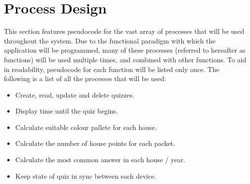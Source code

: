 \section{Process Design}
This section features pseudocode for the vast array of processes that will be used throughout the system. Due to the functional paradigm with which the application will be programmed, many of these processes (referred to hereafter as functions) will be used multiple times, and combined with other functions. To aid in readability, pseudocode for each function will be listed only once. The following is a list of all the processes that will be used:

\begin{itemize}
\item Create, read, update and delete quizzes.
\item Display time until the quiz begins.
\item Calculate suitable colour pallete for each house.
\item Calculate the number of house points for each packet.
\item Calculate the most common answer in each house / year.
\item Keep state of quiz in sync between each device.
\end{itemize}




